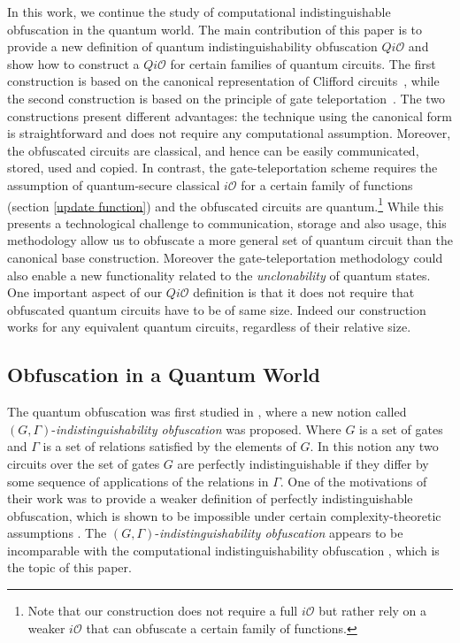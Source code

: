 In this work, we continue the study of computational indistinguishable obfuscation in the quantum world. The main contribution of this paper is to provide a new definition of quantum indistinguishability obfuscation $Qi\mathcal{O}$ and show how to construct a $Qi\mathcal{O}$ for certain families of quantum circuits. The first construction is based on the canonical representation of Clifford circuits~\cite{AG04}, while the second construction is based on the principle of gate teleportation~\cite{GC99}. The two constructions present different advantages: the technique using the canonical form is straightforward and does not require any computational assumption. Moreover, the obfuscated circuits are classical, and hence can be easily communicated, stored, used and copied.  In contrast, the gate-teleportation scheme requires the assumption of quantum-secure classical $i\mathcal{O}$ for a certain family of functions (section \ref{update function}) and the obfuscated circuits are quantum.\footnote{Note that our construction does not require a full $i\mathcal{O}$ but rather rely on a weaker $i\mathcal{O}$ that can obfuscate a certain family of functions.} While this presents a technological challenge to communication, storage and also usage, this methodology allow us to obfuscate a more general set of quantum circuit than the canonical base construction. Moreover the gate-teleportation methodology could also enable a new functionality related to the \emph{unclonability} of quantum states. One important aspect of our $Qi\mathcal{O}$ definition is that it does not require that obfuscated quantum circuits have to be of same size. Indeed our construction works for any equivalent quantum circuits, regardless of their relative size.


\subsection{Obfuscation in a Quantum World}
The quantum obfuscation was first studied in \cite{AJJ14}, where a new notion called
$(G,\Gamma)$-{\em indistinguishability obfuscation} was proposed. Where $G$ is a set of gates and $\Gamma$ is a set of relations satisfied by the elements of $G.$ In this notion any two circuits over the set of gates $G$ are perfectly indistinguishable if they differ by some sequence of applications of the relations in $\Gamma.$ One of the motivations of their work was to provide a weaker definition of perfectly indistinguishable obfuscation, which is shown to be impossible under certain complexity-theoretic assumptions \cite{AJJ14}. The $(G,\Gamma)$-{\em indistinguishability obfuscation}  appears to be incomparable with the computational indistinguishability obfuscation \cite{BGI+12,GGH+13 }, which is the topic of this paper.

